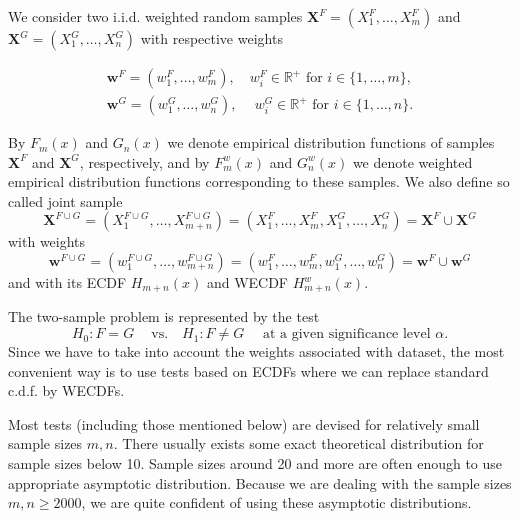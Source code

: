 We consider two i.i.d. weighted random samples $\mathbf{X}^F = (X^F_1,\ldots, X^F_m)$ and $\mathbf{X}^G = (X^G_1, \ldots, X^G_n)$ with respective weights 

\begin{align*}
\mathbf{w}^F = (w^F_1,\ldots, w^F_m), \quad w_i^F \in \mathbb{R}^+ \text{ for }  i \in \lbrace 1, \ldots, m \rbrace, \\
\mathbf{w}^G = (w^G_1,\ldots, w^G_n), \:
\quad w_i^G \in \mathbb{R}^+ \text{ for } i \in \lbrace 1, \ldots, n \rbrace. 
\end{align*}

\noindent By $F_m(x) $ and $ G_n(x)$ we  denote empirical distribution functions of samples $\mathbf{X}^F$ and $\mathbf{X}^G$, respectively, and by $F^w_m(x)$ and $ G^w_n(x)$ we denote weighted empirical distribution functions corresponding to these samples. We also define so called joint sample 
\begin{equation}
\mathbf{X}^{F\cup G} = (X^{F\cup G}_1, \ldots, X^{F\cup G}_{m+n}) = (X^{F}_1, \ldots, X^{F}_{m},X^G_1,\ldots, X^G_n) = \mathbf{X}^{F} \cup \mathbf{X}^{G}
\end{equation}
with weights 
\begin{equation}
\mathbf{w}^{F\cup G} = (w^{F\cup G}_1,\ldots, w^{F\cup G}_{m+n}) = (w^{F}_1,\ldots, w^{F}_{m},w^{G}_1,\ldots, w^{G}_{n}) = \mathbf{w}^{F} \cup \mathbf{w}^{G}
\end{equation}
and with its ECDF $H_{m+n}(x)$ and WECDF $H^w_{m+n}(x)$.


\noindent The two-sample problem is represented by the test
\begin{equation}
H_0: F = G \quad\: \text{vs.}\quad H_1: F \neq G \quad\text{ at a given significance level } \alpha.
\end{equation} 
Since we have to take into account the weights associated with dataset, the most convenient way is to use tests based on ECDFs where we can replace standard c.d.f. by WECDFs. 

Most tests (including those mentioned below) are devised for relatively small sample sizes $m,n$. There usually exists some exact theoretical distribution for sample sizes below 10. Sample sizes around 20 and more are often enough to use appropriate asymptotic distribution. Because we are dealing with the sample sizes $m,n \geq 2000$, we are quite confident of using these asymptotic distributions.

